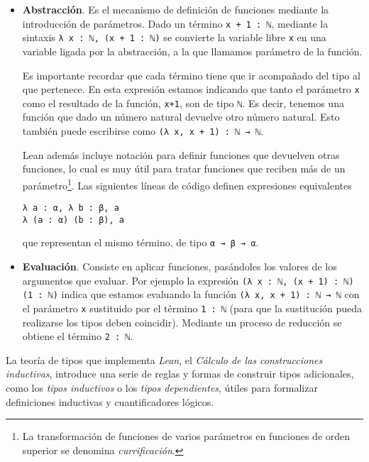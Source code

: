 \begin{itemize}[topsep=0pt]
	\item \textbf{Abstracción}. Es el mecanismo de definición de funciones mediante
	      la introducción de parámetros. Dado un término \lstinline{x + 1 : ℕ},
	      mediante la sintaxis \lstinline{λ x : ℕ, (x + 1 : ℕ)} se convierte la
	      variable libre \lstinline{x} en una variable ligada por la abstracción, a la
	      que llamamos parámetro de la función.

	      Es importante recordar que cada término tiene que ir acompañado del tipo al
	      que pertenece. En esta expresión estamos indicando que tanto el parámetro
	      \lstinline{x} como el resultado de la función, \lstinline{x+1}, son de tipo
	      \lstinline{ℕ}. Es decir, tenemos una función que dado un número natural
	      devuelve otro número natural. Esto también puede escribirse como
	      \lstinline{(λ x, x + 1) : ℕ → ℕ}.

	      Lean además incluye notación para definir funciones que devuelven otras
	      funciones, lo cual es muy útil para tratar funciones que reciben más de un
	      parámetro\footnote{La transformación de funciones de varios
		      parámetros en funciones de orden superior se denomina
		      \textit{currificación}.}. Las siguientes líneas de código
	      definen expresiones equivalentes
	      \begin{lstlisting}
λ a : α, λ b : β, a
λ (a : α) (b : β), a
\end{lstlisting}
	      que representan el mismo término, de tipo \lstinline{α → β → α}.

	\item \textbf{Evaluación}. Consiste en aplicar funciones, pasándoles los
	      valores de los argumentos que evaluar. Por ejemplo la expresión
	      \lstinline{(λ x : ℕ, (x + 1) : ℕ) (1 : ℕ)} indica que estamos evaluando la
	      función \lstinline{(λ x, x + 1) : ℕ → ℕ} con el parámetro \lstinline{x}
	      sustituido por el término \lstinline{1 : ℕ} (para que la sustitución pueda
	      realizarse los tipos deben coincidir). Mediante un proceso de
	      reducción se obtiene el término \lstinline{2 : ℕ}.

\end{itemize}

La teoría de tipos que implementa \textit{Lean}, el \textit{Cálculo de las
	construcciones inductivas}, introduce una serie de reglas y formas de construir
tipos adicionales, como los \textit{tipos inductivos} o los \textit{tipos
	dependientes}, útiles para formalizar definiciones inductivas y cuantificadores
lógicos.

